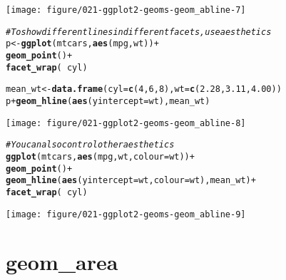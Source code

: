 \documentclass[a4paper,titlepage]{tufte-handout}\usepackage[]{graphicx}\usepackage[]{xcolor}
\makeatletter
\def\maxwidth{ %
  \ifdim\Gin@nat@width>\linewidth
    \linewidth
  \else
    \Gin@nat@width
  \fi
}
\newcommand{\hlnum}[1]{\textcolor[rgb]{0.686,0.059,0.569}{#1}}%
\newcommand{\hlcom}[1]{\textcolor[rgb]{0.678,0.584,0.686}{\textit{#1}}}%
\newcommand{\hlopt}[1]{\textcolor[rgb]{0,0,0}{#1}}%
\newcommand{\hldef}[1]{\textcolor[rgb]{0.345,0.345,0.345}{#1}}%
\newcommand{\hlkwb}[1]{\textcolor[rgb]{0.69,0.353,0.396}{#1}}%
\newcommand{\hlkwc}[1]{\textcolor[rgb]{0.333,0.667,0.333}{#1}}%
\newcommand{\hlkwd}[1]{\textcolor[rgb]{0.737,0.353,0.396}{\textbf{#1}}}%
\newenvironment{kframe}{%
 \def\at@end@of@kframe{}%
 \ifinner\ifhmode%
  \def\at@end@of@kframe{\end{minipage}}%
  \begin{minipage}{\columnwidth}%
 \fi\fi%
 \def\FrameCommand##1{\hskip\@totalleftmargin \hskip-\fboxsep
 \colorbox{shadecolor}{##1}\hskip-\fboxsep
     \hskip-\linewidth \hskip-\@totalleftmargin \hskip\columnwidth}%
 \MakeFramed {\advance\hsize-\width
   \@totalleftmargin\z@ \linewidth\hsize
   \@setminipage}}%
 {\par\unskip\endMakeFramed%
 \at@end@of@kframe}
\newenvironment{knitrout}{}{} %
\makeatother
\begin{document}
\begin{knitrout}
\begin{kframe}
{\ttfamily\noindent\itshape{}}\end{kframe}
\texttt{[image: figure/021-ggplot2-geoms-geom\_abline-7]} 
\begin{kframe}\begin{alltt}
\hlcom{# To show different lines in different facets, use aesthetics}
\hldef{p} \hlkwb{<-} \hlkwd{ggplot}\hldef{(mtcars,} \hlkwd{aes}\hldef{(mpg, wt))} \hlopt{+}
  \hlkwd{geom_point}\hldef{()} \hlopt{+}
  \hlkwd{facet_wrap}\hldef{(}\hlopt{~} \hldef{cyl)}

\hldef{mean_wt} \hlkwb{<-} \hlkwd{data.frame}\hldef{(}\hlkwc{cyl} \hldef{=} \hlkwd{c}\hldef{(}\hlnum{4}\hldef{,} \hlnum{6}\hldef{,} \hlnum{8}\hldef{),} \hlkwc{wt} \hldef{=} \hlkwd{c}\hldef{(}\hlnum{2.28}\hldef{,} \hlnum{3.11}\hldef{,} \hlnum{4.00}\hldef{))}
\hldef{p} \hlopt{+} \hlkwd{geom_hline}\hldef{(}\hlkwd{aes}\hldef{(}\hlkwc{yintercept} \hldef{= wt), mean_wt)}
\end{alltt}
\end{kframe}
\texttt{[image: figure/021-ggplot2-geoms-geom\_abline-8]} 
\begin{kframe}\begin{alltt}
\hlcom{# You can also control other aesthetics}
\hlkwd{ggplot}\hldef{(mtcars,} \hlkwd{aes}\hldef{(mpg, wt,} \hlkwc{colour} \hldef{= wt))} \hlopt{+}
  \hlkwd{geom_point}\hldef{()} \hlopt{+}
  \hlkwd{geom_hline}\hldef{(}\hlkwd{aes}\hldef{(}\hlkwc{yintercept} \hldef{= wt,} \hlkwc{colour} \hldef{= wt), mean_wt)} \hlopt{+}
  \hlkwd{facet_wrap}\hldef{(}\hlopt{~} \hldef{cyl)}
\end{alltt}
\end{kframe}
\texttt{[image: figure/021-ggplot2-geoms-geom\_abline-9]} 
\end{knitrout}


\section{geom\_area}
\end{document}
